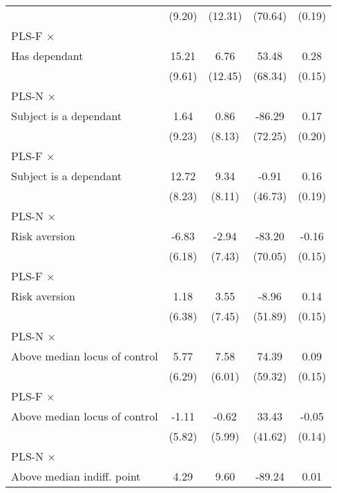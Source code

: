 \begin{table}[htbp]
\begin{tabular}{l*{4}{c}}
                &   (9.20)         &  (12.31)         &  (70.64)         &   (0.19)         \\
\addlinespace
PLS-F $\times$ \\ Has dependant&    15.21         &     6.76         &    53.48         &     0.28\sym{*}  \\
                &   (9.61)         &  (12.45)         &  (68.34)         &   (0.15)         \\
\addlinespace
PLS-N $\times$ \\ Subject is a dependant&     1.64         &     0.86         &   -86.29         &     0.17         \\
                &   (9.23)         &   (8.13)         &  (72.25)         &   (0.20)         \\
\addlinespace
PLS-F $\times$ \\ Subject is a dependant&    12.72         &     9.34         &    -0.91         &     0.16         \\
                &   (8.23)         &   (8.11)         &  (46.73)         &   (0.19)         \\
\addlinespace
PLS-N $\times$ \\ Risk aversion&    -6.83         &    -2.94         &   -83.20         &    -0.16         \\
                &   (6.18)         &   (7.43)         &  (70.05)         &   (0.15)         \\
\addlinespace
PLS-F $\times$ \\ Risk aversion&     1.18         &     3.55         &    -8.96         &     0.14         \\
                &   (6.38)         &   (7.45)         &  (51.89)         &   (0.15)         \\
\addlinespace
PLS-N $\times$ \\ Above median locus of control&     5.77         &     7.58         &    74.39         &     0.09         \\
                &   (6.29)         &   (6.01)         &  (59.32)         &   (0.15)         \\
\addlinespace
PLS-F $\times$ \\ Above median locus of control&    -1.11         &    -0.62         &    33.43         &    -0.05         \\
                &   (5.82)         &   (5.99)         &  (41.62)         &   (0.14)         \\
\addlinespace
PLS-N $\times$ \\ Above median indiff. point&     4.29         &     9.60         &   -89.24\sym{*}  &     0.01         \\

\end{tabular}
\end{table}
